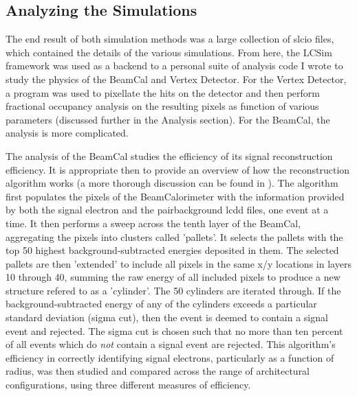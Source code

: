 \documentclass{report}
\begin{document}
            \subsection{Analyzing the Simulations}
                The end result of both simulation methods was a large collection of slcio files, which contained the details of the various simulations. From here, the LCSim framework was used as a backend to a personal suite of analysis code I wrote to study the physics of the BeamCal and Vertex Detector. For the Vertex Detector, a program was used to pixellate the hits on the detector and then perform fractional occupancy analysis on the resulting pixels as function of various parameters (discussed further in the Analysis section). For the BeamCal, the analysis is more complicated.
                
                The analysis of the BeamCal studies the efficiency of its signal reconstruction efficiency. It is appropriate then to provide an overview of how the reconstruction algorithm works (a more thorough discussion can be found in \cite{bogert_thesis}). The algorithm first populates the pixels of the BeamCalorimeter with the information provided by both the signal electron and the pairbackground lcdd files, one event at a time. It then performs a sweep across the tenth layer of the BeamCal, aggregating the pixels into clusters called 'pallets'. It selects the pallets with the top 50 highest background-subtracted energies deposited in them. The selected pallets are then 'extended' to include all pixels in the same x/y locations in layers 10 through 40, summing the raw energy of all included pixels to produce a new structure refered to as a 'cylinder'. The 50 cylinders are iterated through. If the background-subtracted energy of any of the cylinders exceeds a particular standard deviation (sigma cut), then the event is deemed to contain a signal event and rejected. The sigma cut is chosen such that no more than ten percent of all events which do \textit{not} contain a signal event are rejected. This algorithm's efficiency in correctly identifying signal electrons, particularly as a function of radius, was then studied and compared across the range of architectural configurations, using three different measures of efficiency.
\end{document}
